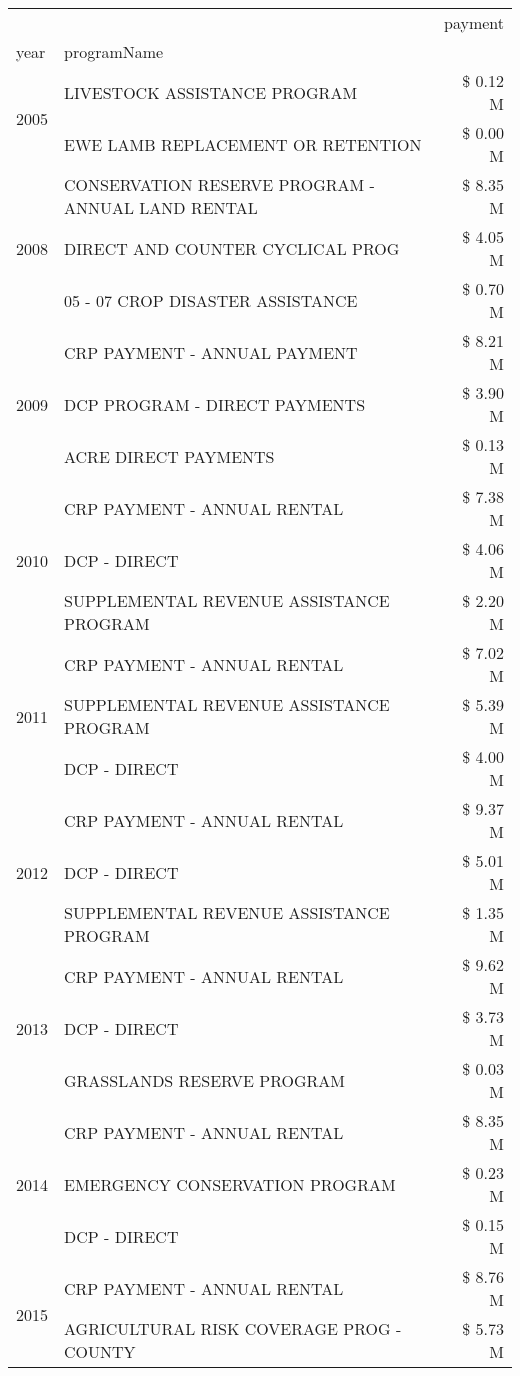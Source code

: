 \begin{tabular}{llr}
\toprule
 &  & payment \\
year & programName &  \\
\midrule
\multirow[t]{2}{*}{2005} & LIVESTOCK ASSISTANCE PROGRAM & \$ 0.12 M \\
 & EWE LAMB REPLACEMENT OR RETENTION & \$ 0.00 M \\
\cline{1-3}
\multirow[t]{3}{*}{2008} & CONSERVATION RESERVE PROGRAM - ANNUAL LAND RENTAL & \$ 8.35 M \\
 & DIRECT AND COUNTER CYCLICAL PROG & \$ 4.05 M \\
 & 05 - 07 CROP DISASTER ASSISTANCE & \$ 0.70 M \\
\cline{1-3}
\multirow[t]{3}{*}{2009} & CRP PAYMENT - ANNUAL PAYMENT & \$ 8.21 M \\
 & DCP PROGRAM - DIRECT PAYMENTS & \$ 3.90 M \\
 & ACRE DIRECT PAYMENTS & \$ 0.13 M \\
\cline{1-3}
\multirow[t]{3}{*}{2010} & CRP PAYMENT - ANNUAL RENTAL & \$ 7.38 M \\
 & DCP - DIRECT & \$ 4.06 M \\
 & SUPPLEMENTAL REVENUE ASSISTANCE PROGRAM & \$ 2.20 M \\
\cline{1-3}
\multirow[t]{3}{*}{2011} & CRP PAYMENT - ANNUAL RENTAL & \$ 7.02 M \\
 & SUPPLEMENTAL REVENUE ASSISTANCE PROGRAM & \$ 5.39 M \\
 & DCP - DIRECT & \$ 4.00 M \\
\cline{1-3}
\multirow[t]{3}{*}{2012} & CRP PAYMENT - ANNUAL RENTAL & \$ 9.37 M \\
 & DCP - DIRECT & \$ 5.01 M \\
 & SUPPLEMENTAL REVENUE ASSISTANCE PROGRAM & \$ 1.35 M \\
\cline{1-3}
\multirow[t]{3}{*}{2013} & CRP PAYMENT - ANNUAL RENTAL & \$ 9.62 M \\
 & DCP - DIRECT & \$ 3.73 M \\
 & GRASSLANDS RESERVE PROGRAM & \$ 0.03 M \\
\cline{1-3}
\multirow[t]{3}{*}{2014} & CRP PAYMENT - ANNUAL RENTAL & \$ 8.35 M \\
 & EMERGENCY CONSERVATION PROGRAM & \$ 0.23 M \\
 & DCP - DIRECT & \$ 0.15 M \\
\cline{1-3}
\multirow[t]{3}{*}{2015} & CRP PAYMENT - ANNUAL RENTAL & \$ 8.76 M \\
 & AGRICULTURAL RISK COVERAGE PROG - COUNTY & \$ 5.73 M \\

\end{tabular}
